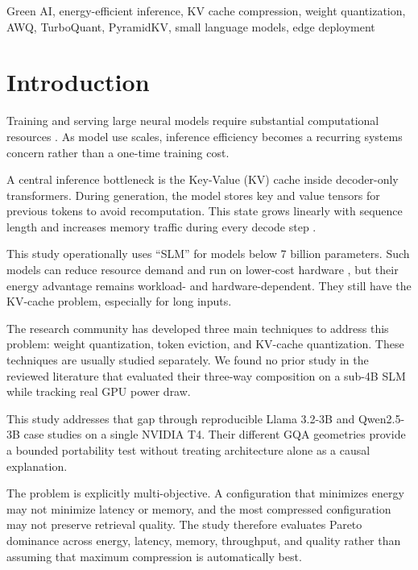 \documentclass[conference]{IEEEtran}
\begin{document}
\begin{IEEEkeywords}
Green AI, energy-efficient inference, KV cache compression, weight quantization, AWQ, TurboQuant, PyramidKV, small language models, edge deployment
\end{IEEEkeywords}


\section{Introduction}

Training and serving large neural models require substantial computational resources \cite{strubell_energy_2019,patterson_carbon_nodate}. As model use scales, inference efficiency becomes a recurring systems concern rather than a one-time training cost.

A central inference bottleneck is the Key-Value (KV) cache inside decoder-only transformers. During generation, the model stores key and value tensors for previous tokens to avoid recomputation. This state grows linearly with sequence length and increases memory traffic during every decode step \cite{liu_kivi_2023,zhang_rdkv_2026}.

This study operationally uses ``SLM'' for models below 7 billion parameters. Such models can reduce resource demand and run on lower-cost hardware \cite{husom_sustainable_2025}, but their energy advantage remains workload- and hardware-dependent. They still have the KV-cache problem, especially for long inputs.

The research community has developed three main techniques to address this problem: weight quantization, token eviction, and KV-cache quantization. These techniques are usually studied separately. We found no prior study in the reviewed literature that evaluated their three-way composition on a sub-4B SLM while tracking real GPU power draw.

This study addresses that gap through reproducible Llama 3.2-3B and Qwen2.5-3B case studies on a single NVIDIA T4. Their different GQA geometries provide a bounded portability test without treating architecture alone as a causal explanation.

The problem is explicitly multi-objective. A configuration that minimizes energy may not minimize latency or memory, and the most compressed configuration may not preserve retrieval quality. The study therefore evaluates Pareto dominance across energy, latency, memory, throughput, and quality rather than assuming that maximum compression is automatically best.
\end{document}
